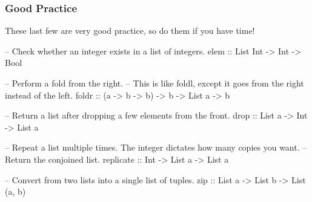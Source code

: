 \documentclass{article}
\begin{document}
\subsubsection*{Good Practice}

These last few are very good practice, so do them if you have time!

\begin{haskellcode}
-- Check whether an integer exists in a list of integers.
elem :: List Int -> Int -> Bool

-- Perform a fold from the right.
-- This is like foldl, except it goes from the right instead of the left.
foldr :: (a -> b -> b) -> b -> List a -> b

-- Return a list after dropping a few elements from the front.
drop :: List a -> Int -> List a

-- Repeat a list multiple times. The integer dictates how many copies you want.
-- Return the conjoined list.
replicate :: Int -> List a -> List a

-- Convert from two lists into a single list of tuples.
zip :: List a -> List b -> List (a, b)
\end{haskellcode}
\end{document}

